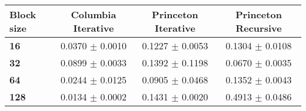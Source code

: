 \begin{tabular}{lccc}\toprule
\textbf{Block size}  & \textbf{Columbia Iterative} & \textbf{Princeton Iterative} & \textbf{Princeton Recursive}\\\midrule
\textbf{16}  & 0.0370 $\pm$ 0.0010 & 0.1227 $\pm$ 0.0053 & 0.1304 $\pm$ 0.0108\\
\textbf{32}  & 0.0899 $\pm$ 0.0033 & 0.1392 $\pm$ 0.1198 & 0.0670 $\pm$ 0.0035\\
\textbf{64}  & 0.0244 $\pm$ 0.0125 & 0.0905 $\pm$ 0.0468 & 0.1352 $\pm$ 0.0043\\
\textbf{128} & 0.0134 $\pm$ 0.0002 & 0.1431 $\pm$ 0.0020 & 0.4913 $\pm$ 0.0486\\
\bottomrule
\end{tabular}
